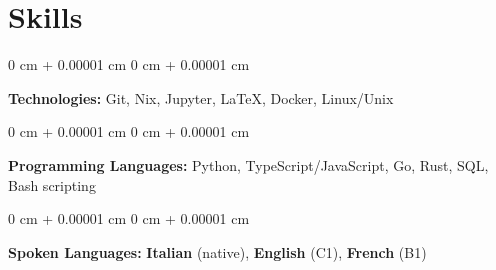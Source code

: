 \documentclass[10pt, letterpaper]{article}
\newenvironment{onecolentry}{
    \begin{adjustwidth}{
        0 cm + 0.00001 cm
    }{
        0 cm + 0.00001 cm
    }
}{
    \end{adjustwidth}
} %
\begin{document}
        \vspace{0.2 cm}

    \section{Skills}
        \begin{onecolentry}
            \textbf{Technologies:} Git, Nix, Jupyter, LaTeX, Docker, Linux/Unix
        \end{onecolentry}

        \vspace{0.2 cm}

        \begin{onecolentry}
            \textbf{Programming Languages:} Python, TypeScript/JavaScript, Go, Rust, SQL, Bash scripting
        \end{onecolentry}

        \vspace{0.2 cm}

        \begin{onecolentry}
            \textbf{Spoken Languages:} \textbf{Italian} (native), \textbf{English} (C1), \textbf{French} (B1) 
        \end{onecolentry}
\end{document}
